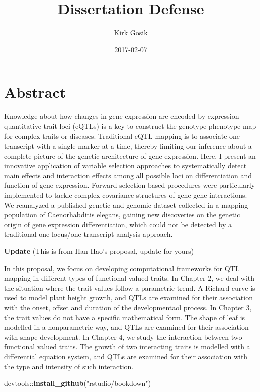 \documentclass[]{book}
\title{Dissertation Defense}
\author{Kirk Gosik}
\date{2017-02-07}
\newenvironment{Shaded}{\begin{snugshade}}{\end{snugshade}}
\newcommand{\KeywordTok}[1]{\textcolor[rgb]{0.13,0.29,0.53}{\textbf{{#1}}}}
\newcommand{\StringTok}[1]{\textcolor[rgb]{0.31,0.60,0.02}{{#1}}}
\newcommand{\NormalTok}[1]{{#1}}
\theoremstyle{definition}
\theoremstyle{definition}
\theoremstyle{remark}
\begin{document}
\maketitle

{
\setcounter{tocdepth}{1}
\tableofcontents
}
\chapter*{Abstract}\label{abstract}

Knowledge about how changes in gene expression are encoded by expression
quantitative trait loci (eQTLs) is a key to construct the
genotype-phenotype map for complex traits or diseases. Traditional eQTL
mapping is to associate one transcript with a single marker at a time,
thereby limiting our inference about a complete picture of the genetic
architecture of gene expression. Here, I present an innovative
application of variable selection approaches to systematically detect
main effects and interaction effects among all possible loci on
differentiation and function of gene expression. Forward-selection-based
procedures were particularly implemented to tackle complex covariance
structures of gene-gene interactions. We reanalyzed a published genetic
and genomic dataset collected in a mapping population of Caenorhabditis
elegans, gaining new discoveries on the genetic origin of gene
expression differentiation, which could not be detected by a traditional
one-locus/one-transcript analysis approach.

\textbf{Update} (This is from Han Hao's proposal, update for yours)

In this proposal, we focus on developing computational frameworks for
QTL mapping in different types of functional valued traits. In Chapter
2, we deal with the situation where the trait values follow a parametric
trend. A Richard curve is used to model plant height growth, and QTLs
are examined for their association with the onset, offset and duration
of the developmentaol process. In Chapter 3, the trait values do not
have a specific mathematical form. The shape of leaf is modelled in a
nonparametric way, and QTLs are examined for their association with
shape development. In Chapter 4, we study the interaction between two
functional valued traits. The growth of two interacting traits is
modelled with a differential equation system, and QTLs are examined for
their association with the type and intensity of such interaction.

\begin{Shaded}
\begin{Highlighting}[]
\NormalTok{devtools::}\KeywordTok{install_github}\NormalTok{(}\StringTok{"rstudio/bookdown"}\NormalTok{)}
\end{Highlighting}
\end{Shaded}
\end{document}
